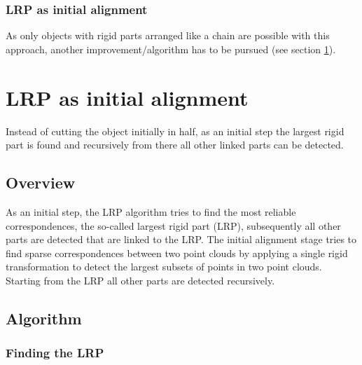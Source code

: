 \documentclass[a4paper,english,11pt]{report}
\begin{document}
\subsubsection{LRP as initial alignment}

As only objects with rigid parts arranged like a chain are possible with this approach, another improvement/algorithm has to be pursued (see section \ref{sec:LRP}).

\section{LRP as initial alignment}
\label{sec:LRP}

Instead of cutting the object initially in half, as an initial step the largest rigid part is found and recursively from there all other linked parts can be detected.

\subsection{Overview}
As an initial step, the LRP algorithm tries to find the most reliable correspondences, the so-called largest rigid part (LRP), subsequently all other parts are detected that are linked to the LRP. The initial alignment stage tries to find sparse correspondences between two point clouds by applying a single rigid transformation to detect the largest subsets of points in two point clouds. Starting from the LRP all other parts are detected recursively.

\subsection{Algorithm} 

\subsubsection{Finding the LRP}
\end{document}
